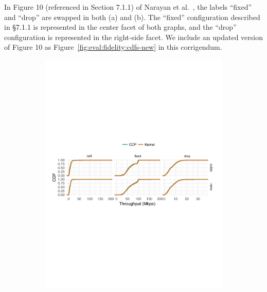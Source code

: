 \documentclass[format=acmlarge,10pt,screen,nonacm,natbib=false]{acmart}
\begin{document}
\begin{sloppypar}
    In Figure 10 (referenced in Section 7.1.1) of Narayan et al.~\cite{ccp}, the labels ``fixed'' and ``drop'' are swapped in both (a) and (b). The ``fixed'' configuration described in \S7.1.1 is represented in the center facet of both graphs, and the ``drop'' configuration is represented in the right-side facet.
    We include an updated version of Figure 10 as Figure~\ref{fig:eval:fidelity:cdfs-new} in this corrigendum.

\begin{figure}[h!]
\centering
\begin{subfigure}{\columnwidth}
\includegraphics[width=\columnwidth]{img/throughput-cdf-flat}
\label{fig:eval:fidelity:tput-cdf}
\end{subfigure}
%
\begin{subfigure}{\columnwidth}

\end{subfigure}
\end{figure}
\end{sloppypar}
\end{document}
